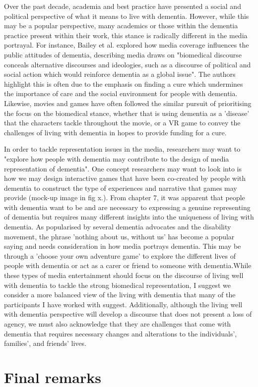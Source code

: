 Over the past decade, academia and best practice have presented a social and political perspective of what it means to live with dementia. However, while this may be a popular perspective, many academics or those within the dementia practice present within their work, this stance is radically different in the media portrayal. For instance, Bailey et al. explored how media coverage influences the public attitudes of dementia, describing media draws on "biomedical discourse conceals alternative discourses and ideologies, such as a discourse of political and social action which would reinforce dementia as a global issue". The authors highlight this is often due to the emphasis on finding a cure which undermines the importance of care and the social environment for people with dementia. Likewise, movies and games have often followed the similar pursuit of prioritising the focus on the biomedical stance, whether that is using dementia as a 'disease' that the characters tackle throughout the movie, or a VR game to convey the challenges of living with dementia in hopes to provide funding for a cure.

In order to tackle representation issues in the media, researchers may want to "explore how people with dementia may contribute to the design of media representation of dementia". One concept researchers may want to look into is how we may design interactive games that have been co-created by people with dementia to construct the type of experiences and narrative that games may provide (mock-up image in fig x.). From chapter 7, it was apparent that people with dementia want to be and are necessary to expressing a genuine representing of dementia but requires many different insights into the uniqueness of living with dementia. As popularised by several dementia advocates and the disability movement, the phrase 'nothing about us, without us' has become a popular saying and needs consideration in how media portrays dementia. This may be through a 'choose your own adventure game' to explore the different lives of people with dementia or act as a carer or friend to someone with dementia.While these types of media entertainment should focus on the discourse of living well with dementia to tackle the strong biomedical representation, I suggest we consider a more balanced view of the living with dementia that many of the participants I have worked with suggest. Additionally, although the living well with dementia perspective will develop a discourse that does not present a loss of agency, we must also acknowledge that they are challenges that come with dementia that requires necessary changes and alterations to the individuals', families', and friends' lives. 

\section{Final remarks}
\label{Discussion:FinalRemarks}